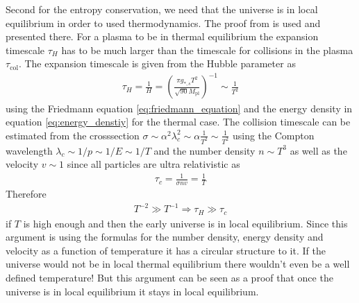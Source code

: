 \documentclass[a4paper, 12pt]{article}
\begin{document}
Second for the entropy conservation, we need that the universe is
in local equilibrium in order to used thermodynamics. The proof from \cite[Sec. 3.3, Page. 74]{CosmologyBookMukhanov} is used and presented there.
For a plasma to be in thermal equilibrium the expansion timescale $\tau_H$ has
to be much larger than the timescale for collisions in the plasma $\tau_\mathrm{col}$.
The expansion timescale is given from the Hubble parameter as
\begin{align*}
    \tau_H = \frac{1}{H} = \left( \frac{\pi g_{*,s} T^2}{\sqrt{90} M_\mathrm{pl}} \right)^{-1}
    \sim \frac{1}{T^2}
\end{align*}
using the Friedmann equation \ref{eq:friedmann_equation} and the
energy density in equation \ref{eq:energy_denstiy} for the thermal case.
The collision timescale can be estimated from the crosssection
$\sigma \sim \alpha^2 \lambda_c^2 \sim \alpha \frac{1}{T^2} \sim \frac{1}{T^2}$
using the Compton wavelength $\lambda_c \sim 1 / p \sim 1 / E \sim 1 / T$
and the number density $n \sim T^3$ as well as the velocity
$v \sim 1$ since all particles are ultra relativistic as
\begin{align*}
    \tau_c = \frac{1}{\sigma n v} = \frac{1}{T}
\end{align*}
Therefore
\begin{align*}
    T^{-2} \gg T^{-1} \Rightarrow \tau_H \gg \tau_c
\end{align*}
if $T$ is high enough and then the early universe is in
local equilibrium.
Since this argument is using the formulas for
the number density, energy density and velocity
as a function of temperature it has a circular structure to it. If the universe would not be
in local thermal equilibrium
there wouldn't even be a well defined  temperature!
But this argument can be seen as a proof
that once the universe is in local equilibrium
it stays in local equilibrium.
\end{document}

